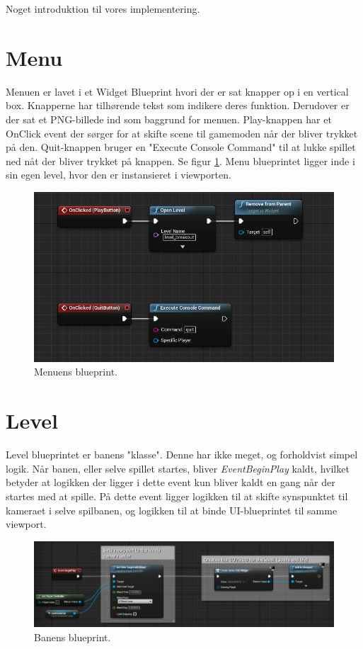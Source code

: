 Noget introduktion til vores implementering.

\section{Menu}
Menuen er lavet i et Widget Blueprint hvori der er sat knapper op i en vertical box. Knapperne har tilhørende tekst som indikere deres funktion. Derudover er der sat et PNG-billede ind som baggrund for menuen. Play-knappen har et OnClick event der sørger for at skifte scene til gamemoden når der bliver trykket på den. Quit-knappen bruger en "Execute Console Command" til at lukke spillet ned nåt der bliver trykket på knappen. Se figur \ref{dia:menublueprint}. Menu blueprintet ligger inde i sin egen level, hvor den er instansieret i viewporten.

\begin{figure}
	\begin{center}
		\caption{Menuens blueprint.}
		\label{dia:menublueprint}
		\includegraphics[width=0.80\linewidth]{pictures/blueprints/menu_blueprint}
	\end{center}
\end{figure}

\section{Level}
Level blueprintet er banens "klasse". Denne har ikke meget, og forholdvist simpel logik. Når banen, eller selve spillet startes, bliver \textit{EventBeginPlay} kaldt, hvilket betyder at logikken der ligger i dette event kun bliver kaldt en gang når der startes med at spille. På dette event ligger logikken til at skifte synspunktet til kameraet i selve spilbanen, og logikken til at binde UI-blueprintet til samme viewport.

\begin{figure}
	\begin{center}
		\caption{Banens blueprint.}
		\label{dia:levelblueprint}
		\includegraphics[width=0.98\linewidth]{pictures/blueprints/level_blueprint}
	\end{center}
\end{figure}

